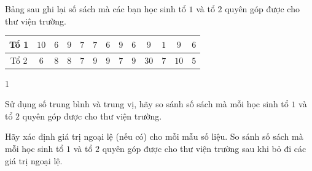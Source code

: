 \begin{bt}%
	Bảng sau ghi lại số sách mà các bạn học sinh tổ $1$ và tổ $2$ quyên góp được cho thư viện trường.
	\begin{center}
		\begin{tabular}{|c|c|c|c|c|c|c|c|c|c|c|c|c|}
			\hline Tổ 1 & $10$ &$ 6 $& $9$ & $7$ & $7$ & $6$ & $9$ & $6$ & $9$ & $1$ & $9$ & $6$ \\
			\hline Tổ 2 & $6$ & $8$ & $8$ & $7$ & $9$ & $9$ & $7$ & $9$ & $30$ & $7$ & $10$ & $5$ \\
			\hline
		\end{tabular}
	\end{center}
	\begin{enumEX}[a)]{1}
		\item Sử dụng số trung bình và trung vị, hãy so sánh số sách mà mỗi học sinh tổ $1$ và tổ $2$ quyên góp được cho thư viện trường.
		\item Hãy xác định giá trị ngoại lệ (nếu có) cho mỗi mẫu số liệu. So sánh số sách mà mỗi học sinh tổ $1$ và tổ $2$ quyên góp được cho thư viện trường sau khi bỏ đi các giá trị ngoại lệ.
	\end{enumEX}
\end{bt}
